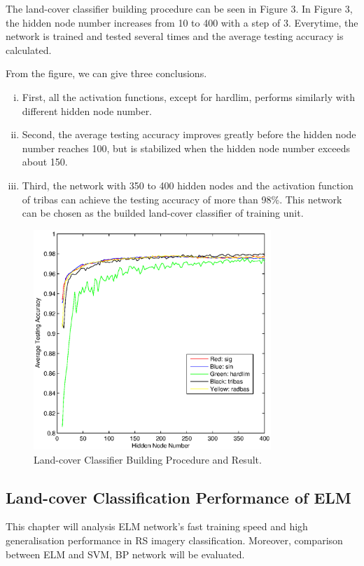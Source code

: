 \documentclass{elsart}
\begin{document}
The land-cover classifier building procedure can be seen in Figure 3.
In Figure 3, the hidden node number increases from 10 to 400 with a step of 3.
Everytime, the network is trained and tested several times and the average testing accuracy is calculated.
\par
From the figure, we can give three conclusions.
\begin{enumerate}[(i)]
\item First, all the activation functions, except for hardlim, performs similarly with different hidden node number.
\item Second, the average testing accuracy improves greatly before the hidden node number reaches 100, but is stabilized when the hidden node number exceeds about 150.
\item Third, the network with 350 to 400 hidden nodes and the activation function of tribas can achieve the testing accuracy of more than 98\%.
 This network can be chosen as the builded land-cover classifier of training unit.  
\end{enumerate}
\begin{figure}[H]
\begin{center}
\includegraphics[width=0.8\textwidth]{itr.eps}
\caption{Land-cover Classifier Building Procedure and Result.}
\label{method}
\end{center}
\end{figure}
\par

\subsection{Land-cover Classification Performance of ELM}
This chapter will analysis ELM network's fast training speed and high generalisation performance in RS imagery classification.
Moreover, comparison between ELM and SVM, BP network will be evaluated. 
\par
\end{document}
